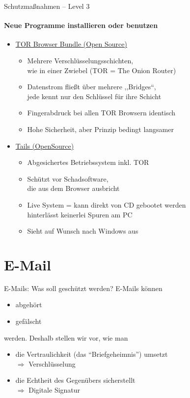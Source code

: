   \begin{frame}{Schutzmaßnahmen -- Level 3}
  \framesubtitle{Neue Programme installieren oder benutzen}
    \begin{itemize}
      \item \href{https://www.torproject.org}{TOR Browser Bundle (Open Source)}
      \begin{itemize}
        \item Mehrere Verschlüsselungsschichten,\\ wie in einer Zwiebel (TOR = The Onion Router)
        \item Datenstrom fließt über mehrere ,,Bridges``,\\ jede kennt nur den Schlüssel für ihre Schicht
        \item Fingerabdruck bei allen TOR Browsern identisch
        \item Hohe Sicherheit, aber Prinzip bedingt langsamer
      \end{itemize}
      \item \href{https://tails.boum.org}{Tails (OpenSource)}
      \begin{itemize}
        \item Abgesichertes Betriebssystem inkl. TOR
        \item Schützt vor Schadsoftware,\\ die aus dem Browser ausbricht
        \item Live System = kann direkt von CD gebootet werden\\ hinterlässt keinerlei Spuren am PC
        \item Sieht auf Wunsch nach Windows aus
      \end{itemize}
    \end{itemize}
  \end{frame}

\section{E-Mail}
  \begin{frame}{E-Mails: Was soll geschützt werden?}
    E-Mails können
    \begin{itemize}
      \item abgehört
      \item gefälscht
    \end{itemize}
    werden. Deshalb stellen wir vor, wie man
    \begin{itemize}
      \item die Vertraulichkeit (das ``Briefgeheimnis'') umsetzt
      \\ $\Rightarrow$ Verschlüsselung
      \item die Echtheit des Gegenübers sicherstellt
      \\ $\Rightarrow$ Digitale Signatur
    \end{itemize}
  \end{frame}


